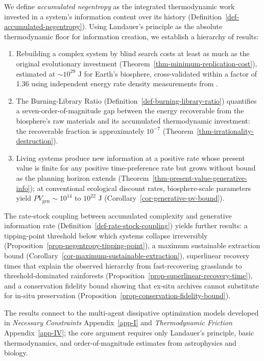 \documentclass[11pt]{article}
\theoremstyle{plain}
\theoremstyle{definition}
\theoremstyle{remark}
\providecommand{\tightlist}{%
  \setlength{\itemsep}{0pt}\setlength{\parskip}{0pt}}
\begin{document}
We define \emph{accumulated negentropy} as the integrated thermodynamic
work invested in a system's information content over its history
(Definition~\ref{def-accumulated-negentropy}). Using Landauer's
principle \citep{Landauer1961} as the absolute thermodynamic floor for
information creation, we establish a hierarchy of results:

\begin{enumerate}
\def\labelenumi{\arabic{enumi}.}
\tightlist
\item
  Rebuilding a complex system by blind search costs at least as much as
  the original evolutionary investment
  (Theorem~\ref{thm-minimum-replication-cost}), estimated at
  \(\sim 10^{29}\) J for Earth's biosphere, cross-validated within a
  factor of 1.36 using independent energy rate density measurements from
  \citep{Chaisson2011}.
\item
  The Burning-Library Ratio (Definition~\ref{def-burning-library-ratio})
  quantifies a seven-order-of-magnitude gap between the energy
  recoverable from the biosphere's raw materials and its accumulated
  thermodynamic investment: the recoverable fraction is approximately
  \(10^{-7}\) (Theorem~\ref{thm-irrationality-destruction}).
\item
  Living systems produce new information at a positive rate whose
  present value is finite for any positive time-preference rate but
  grows without bound as the planning horizon extends
  (Theorem~\ref{thm-present-value-generative-info}); at conventional
  ecological discount rates, biosphere-scale parameters yield
  \(PV_{\text{gen}} \sim 10^{14}\) to \(10^{22}\) J
  (Corollary~\ref{cor-generative-pv-bound}).
\end{enumerate}

The rate-stock coupling between accumulated complexity and generative
information rate (Definition~\ref{def-rate-stock-coupling}) yields
further results: a tipping-point threshold below which systems collapse
irreversibly (Proposition~\ref{prop-negentropy-tipping-point}), a
maximum sustainable extraction bound
(Corollary~\ref{cor-maximum-sustainable-extraction}), superlinear
recovery times that explain the observed hierarchy from fast-recovering
grasslands to threshold-dominated rainforests
(Proposition~\ref{prop-superlinear-recovery-time}), and a conservation
fidelity bound showing that ex-situ archives cannot substitute for
in-situ preservation
(Proposition~\ref{prop-conservation-fidelity-bound}).

The results connect to the multi-agent dissipative optimization models
developed in \emph{Necessary Constraints} Appendix~\ref{app-I} and
\emph{Thermodynamic Friction} Appendix~\ref{app-IV}; the core argument
requires only Landauer's principle, basic thermodynamics, and
order-of-magnitude estimates from astrophysics and biology.
\end{document}
